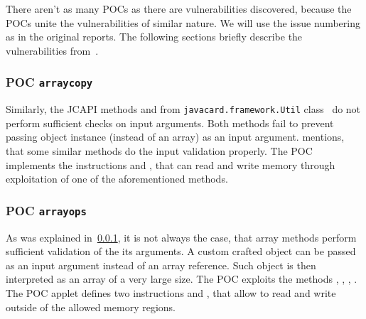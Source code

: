 \documentclass{../llncs/llncs}
\begin{document}
There aren't as many POCs as there are vulnerabilities discovered, because the POCs unite the vulnerabilities of similar nature. We will use the issue numbering as in the original reports. The following sections briefly describe the vulnerabilities from~\cite{se:oracle:part1}.

\subsubsection{POC \texttt{arraycopy}}\label{subsec:arraycopy-explanation}
Similarly, the JCAPI methods \arrayCopy and \arrayCopyNonAtomic from \texttt{javacard.framework.Util} class~\cite{jcspecs31download} do not perform sufficient checks on input arguments. Both methods fail to prevent passing object instance (instead of an array) as an input argument. \cite{se:oracle:part1} mentions, that some similar methods do the input validation properly. The POC implements the instructions \readmem and \writemem, that can read and write memory through exploitation of one of the aforementioned methods.

\subsubsection{POC \texttt{arrayops}}
As was explained in~\ref{subsec:arraycopy-explanation}, it is not always the case, that array methods perform sufficient validation of the its arguments. A custom crafted object can be passed as an input argument instead of an array reference. Such object is then interpreted as an array of a very large size. The POC \arrayops exploits the methods \arrayFill, \arrayFillNonAtomic, \setShort, \setInt. The POC applet defines two instructions \readmem and \writemem, that allow to read and write outside of the allowed memory regions.

\end{document}
